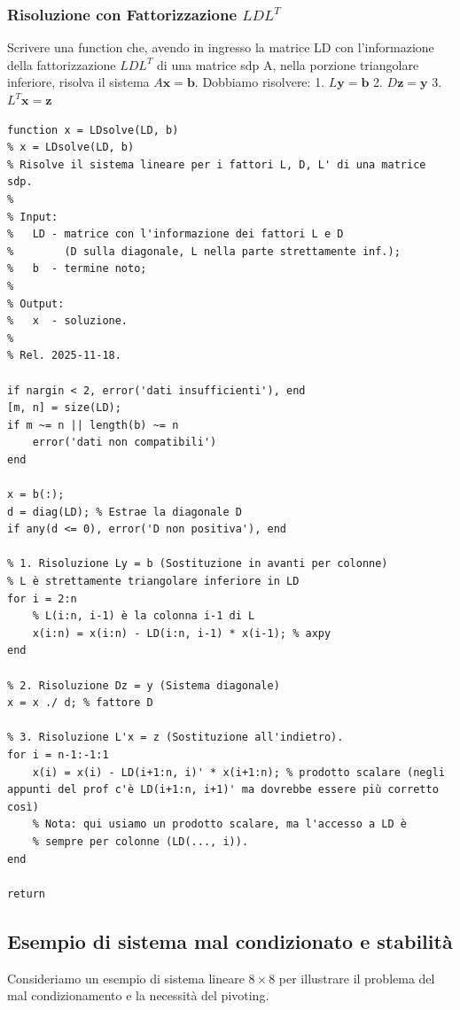 \subsubsection{Risoluzione con Fattorizzazione $LDL^T$}
Scrivere una function che, avendo in ingresso la matrice LD con l'informazione della fattorizzazione $LDL^T$ di una matrice sdp A, nella porzione triangolare inferiore, risolva il sistema $A\mathbf{x} = \mathbf{b}$.
Dobbiamo risolvere:
1. $L \mathbf{y} = \mathbf{b}$
2. $D \mathbf{z} = \mathbf{y}$
3. $L^T \mathbf{x} = \mathbf{z}$

\begin{lstlisting}
function x = LDsolve(LD, b)
% x = LDsolve(LD, b)
% Risolve il sistema lineare per i fattori L, D, L' di una matrice sdp.
%
% Input:
%   LD - matrice con l'informazione dei fattori L e D
%        (D sulla diagonale, L nella parte strettamente inf.);
%   b  - termine noto;
%
% Output:
%   x  - soluzione.
%
% Rel. 2025-11-18.

if nargin < 2, error('dati insufficienti'), end
[m, n] = size(LD);
if m ~= n || length(b) ~= n
    error('dati non compatibili')
end

x = b(:);
d = diag(LD); % Estrae la diagonale D
if any(d <= 0), error('D non positiva'), end

% 1. Risoluzione Ly = b (Sostituzione in avanti per colonne)
% L è strettamente triangolare inferiore in LD
for i = 2:n
    % L(i:n, i-1) è la colonna i-1 di L
    x(i:n) = x(i:n) - LD(i:n, i-1) * x(i-1); % axpy
end

% 2. Risoluzione Dz = y (Sistema diagonale)
x = x ./ d; % fattore D

% 3. Risoluzione L'x = z (Sostituzione all'indietro).
for i = n-1:-1:1
    x(i) = x(i) - LD(i+1:n, i)' * x(i+1:n); % prodotto scalare (negli appunti del prof c'è LD(i+1:n, i+1)' ma dovrebbe essere più corretto così)
    % Nota: qui usiamo un prodotto scalare, ma l'accesso a LD è
    % sempre per colonne (LD(..., i)).
end

return
\end{lstlisting}

\subsection{Esempio di sistema mal condizionato e stabilità}

Consideriamo un esempio di sistema lineare $8 \times 8$ per illustrare il problema del mal condizionamento e la necessità del pivoting.

